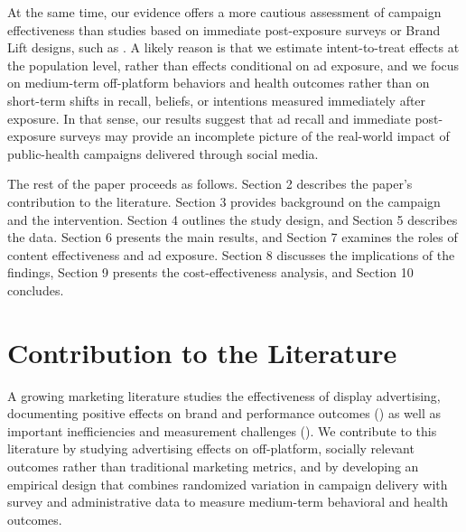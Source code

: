 At the same time, our evidence offers a more cautious assessment of campaign effectiveness than studies based on immediate post-exposure surveys or Brand Lift designs, such as \citet{atheycovid2023}. A likely reason is that we estimate intent-to-treat effects at the population level, rather than effects conditional on ad exposure, and we focus on medium-term off-platform behaviors and health outcomes rather than on short-term shifts in recall, beliefs, or intentions measured immediately after exposure. In that sense, our results suggest that ad recall and immediate post-exposure surveys may provide an incomplete picture of the real-world impact of public-health campaigns delivered through social media.

The rest of the paper proceeds as follows. Section 2 describes the paper’s contribution to the literature. Section 3 provides background on the campaign and the intervention. Section 4 outlines the study design, and Section 5 describes the data. Section 6 presents the main results, and Section 7 examines the roles of content effectiveness and ad exposure. Section 8 discusses the implications of the findings, Section 9 presents the cost-effectiveness analysis, and Section 10 concludes.




\section{Contribution to the Literature}

A growing marketing literature studies the effectiveness of display advertising, documenting positive effects on brand and performance outcomes (\citealt{goldfarb2011privacy, lewis2014online, johnson2017less, bart2014products}) as well as important inefficiencies and measurement challenges (\citealt{gordon2021inefficiencies, johnson2023inferno}). We contribute to this literature by studying advertising effects on off-platform, socially relevant outcomes rather than traditional marketing metrics, and by developing an empirical design that combines randomized variation in campaign delivery with survey and administrative data to measure medium-term behavioral and health outcomes. 

